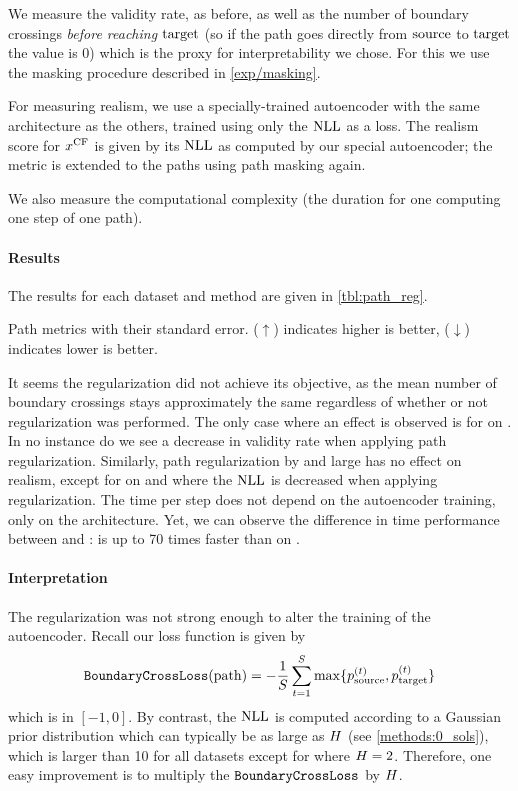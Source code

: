 \documentclass[../main.tex]{subfiles}
\begin{document}
We measure the validity rate, as before, as well as the number of boundary crossings \emph{before reaching $\mathrm{target}$} (so if the path goes directly from $\mathrm{source}$ to $\mathrm{target}$ the value is 0) which is the proxy for interpretability we chose.
For this we use the masking procedure described in \autoref{exp/masking}.

For measuring realism, we use a specially-trained autoencoder with the same architecture as the others, trained using only the $\text{NLL}$ as a loss.
The realism score for $x^\mathrm{CF}$ is given by its $\text{NLL}$ as computed by our special autoencoder;
the metric is extended to the paths using path masking again.

We also measure the computational complexity (the duration for one computing one step of one path).

\paragraph{Results}

The results for each dataset and method are given in \autoref{tbl:path_reg}.

\begin{table}[h!]
    \centering
    
    \caption{Path metrics with their standard error. ($\uparrow$) indicates higher is better, ($\downarrow$) indicates lower is better.}
    \label{tbl:path_reg}
\end{table}

It seems the regularization did not achieve its objective, as the mean number of boundary crossings stays approximately the same regardless of whether or not regularization was performed.
The only case where an effect is observed is for \revise{} on \CakeOnSea{}.
In no instance do we see a decrease in validity rate when applying path regularization.
Similarly, path regularization by and large has no effect on realism, except for \ls{} on \CakeOnSea{} and \ForestCover{} where the $\text{NLL}$ is decreased when applying regularization.
The time per step does not depend on the autoencoder training, only on the architecture.
Yet, we can observe the difference in time performance between \ls{} and \revise{}: \ls{} is up to 70 times faster than \revise{} on \OnlineNewsPopularity{}.

\paragraph{Interpretation}

The regularization was not strong enough to alter the training of the autoencoder.
Recall our loss function is given by
\begin{align*}
    \mathtt{BoundaryCrossLoss}(\mathrm{path}) =
    - \frac{1}{S} \sum_{t=1}^{S}
    \max \{ p^{(t)}_{\mathrm{source}}, p^{(t)}_{\mathrm{target}} \}
\end{align*}
which is in $[-1, 0]$.
By contrast, the $\text{NLL}$ is computed according to a Gaussian prior distribution which can typically be as large as $H$ (see \autoref{methods:0_sols}), which is larger than 10 for all datasets except for \CakeOnSea{} where $H=2$.
Therefore, one easy improvement is to multiply the $\mathtt{BoundaryCrossLoss}$ by $H$.
\end{document}
